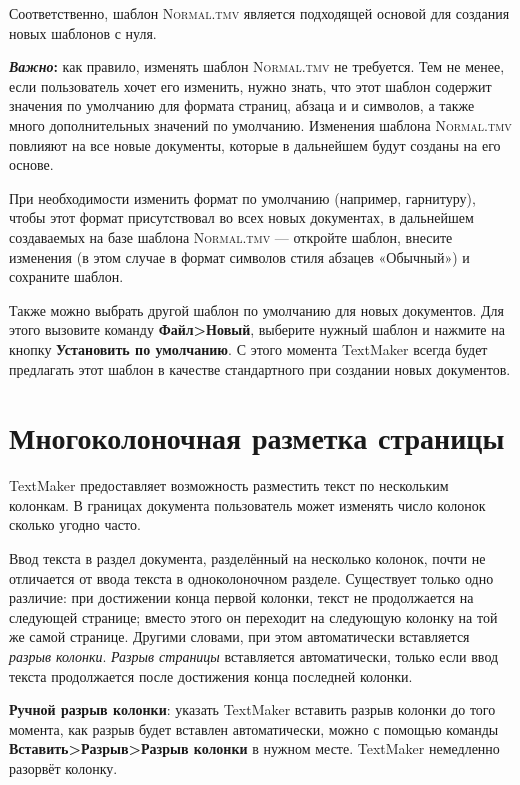﻿\documentclass[a4paper,10pt]{article}
\begin{document}
Соответственно, шаблон \textsc{Normal.tmv} является подходящей основой для создания новых шаблонов с нуля.

\begin{mdframed}[backgroundcolor=blue!10]
\textbf{\textit{Важно}:} как правило, изменять шаблон \textsc{Normal.tmv} не требуется. Тем не менее, если пользователь хочет его изменить, нужно знать, что этот шаблон содержит значения по умолчанию для формата страниц, абзаца и и символов, а также много дополнительных значений по умолчанию. Изменения шаблона \textsc{Normal.tmv} повлияют на все новые документы, которые в дальнейшем будут созданы на его основе.
\end{mdframed}

При необходимости изменить формат по умолчанию (например, гарнитуру), чтобы этот формат присутствовал во всех новых документах, в дальнейшем создаваемых на базе шаблона \textsc{Normal.tmv}  — откройте шаблон, внесите изменения (в этом случае в формат символов стиля абзацев «Обычный») и сохраните шаблон.

Также можно выбрать другой шаблон по умолчанию для новых документов. Для этого вызовите команду \textbf{Файл>Новый}, выберите нужный шаблон и нажмите на кнопку \textbf{Установить по умолчанию}. С этого момента TextMaker всегда будет предлагать этот шаблон в качестве стандартного при создании новых документов.

\section{Многоколоночная разметка страницы} \label{sec:многразмстр}
TextMaker предоставляет возможность разместить текст по нескольким колонкам. В границах документа пользователь может изменять число колонок сколько угодно часто.

Ввод текста в раздел документа, разделённый на несколько колонок, почти не отличается от ввода текста в одноколоночном разделе. Существует только одно различие: при достижении конца первой колонки, текст не продолжается на следующей странице; вместо этого он переходит на следующую колонку на той же самой странице. Другими словами, при этом автоматически вставляется \textit{разрыв колонки}. \textit{Разрыв страницы} вставляется автоматически, только если ввод текста продолжается после достижения конца последней колонки.

\textbf{Ручной разрыв колонки}: указать TextMaker вставить разрыв колонки до того момента, как разрыв будет вставлен автоматически, можно с помощью команды \textbf{Вставить>Разрыв>Разрыв колонки} в нужном месте. TextMaker немедленно разорвёт колонку.
\end{document}
